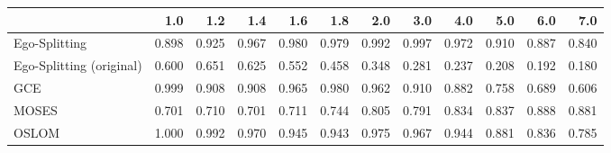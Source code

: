 \begin{tabular}{lrrrrrrrrrrr}
\toprule
{} &   1.0 &   1.2 &   1.4 &   1.6 &   1.8 &   2.0 &   3.0 &   4.0 &   5.0 &   6.0 &   7.0 \\
\midrule
Ego-Splitting            & 0.898 & 0.925 & 0.967 & 0.980 & 0.979 & 0.992 & 0.997 & 0.972 & 0.910 & 0.887 & 0.840 \\
Ego-Splitting (original) & 0.600 & 0.651 & 0.625 & 0.552 & 0.458 & 0.348 & 0.281 & 0.237 & 0.208 & 0.192 & 0.180 \\
GCE                      & 0.999 & 0.908 & 0.908 & 0.965 & 0.980 & 0.962 & 0.910 & 0.882 & 0.758 & 0.689 & 0.606 \\
MOSES                    & 0.701 & 0.710 & 0.701 & 0.711 & 0.744 & 0.805 & 0.791 & 0.834 & 0.837 & 0.888 & 0.881 \\
OSLOM                    & 1.000 & 0.992 & 0.970 & 0.945 & 0.943 & 0.975 & 0.967 & 0.944 & 0.881 & 0.836 & 0.785 \\
\bottomrule
\end{tabular}
